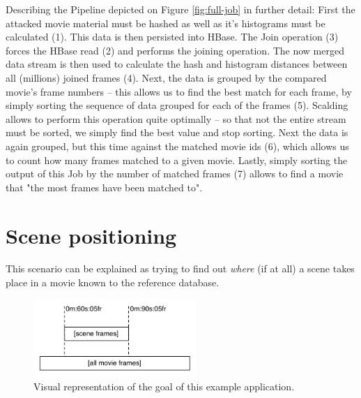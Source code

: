 Describing the Pipeline depicted on Figure \ref{fig:full-job} in further detail: First the attacked movie material must be hashed as well as it's histograms must be calculated (1). This data is then persisted into HBase. The Join operation (3) forces the HBase read (2) and performs the joining operation. The now merged data stream is then used to calculate the hash and histogram distances between all (millions) joined frames (4). Next, the data is grouped by the compared movie's frame numbers -- this allows us to find the best match for each frame, by simply sorting the sequence of data grouped for each of the frames (5). Scalding allows to perform this operation quite optimally -- so that not the entire stream must be sorted, we simply find the best value and stop sorting. Next the data is again grouped, but this time against the matched movie ids (6), which allows us to count how many frames matched to a given movie. Lastly, simply sorting the output of this Job by the number of matched frames (7) allows to find a movie that "the most frames have been matched to".


\section{Scene positioning}
\label{sec:scene-detection}
This scenario can be explained as trying to find out \textit{where} (if at all) a scene takes place in a movie known to the reference database. 

\begin{figure}[ch!]
  \centering
  \includegraphics[width=0.55\textwidth]{img/frames-timeline-matching}
  \caption{Visual representation of the goal of this example application.}
\end{figure}

